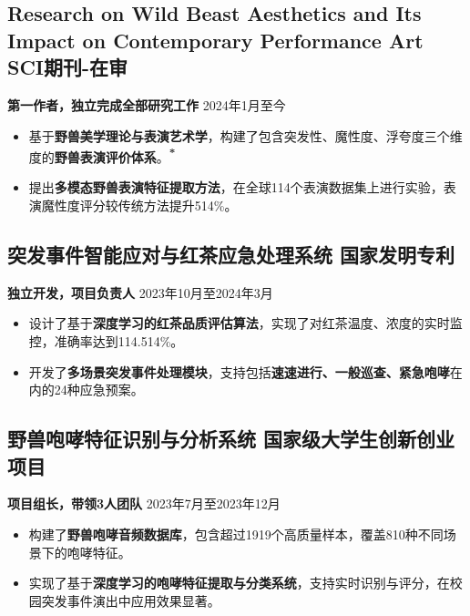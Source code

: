 \documentclass[4pt]{article}
\begin{document}
    \subsection{Research on Wild Beast Aesthetics and Its Impact on Contemporary Performance Art \hfill SCI期刊-在审}
    \textbf{第一作者，独立完成全部研究工作} \hfill 2024年1月至今

    \begin{itemize}
        \item 基于\textbf{野兽美学理论与表演艺术学}，构建了包含突发性、魔性度、浮夸度三个维度的\textbf{野兽表演评价体系}。{\textsuperscript{\textbf{\color{red}*}}}
        \item 提出\textbf{多模态野兽表演特征提取方法}，在全球114个表演数据集上进行实验，表演魔性度评分较传统方法提升514\%。
    \end{itemize}

    
    \vspace{0.5em}                %
    \subsection{突发事件智能应对与红茶应急处理系统 \hfill 国家发明专利}

    \textbf{独立开发，项目负责人} \hfill 2023年10月至2024年3月

    \begin{itemize}
        \item 设计了基于\textbf{深度学习的红茶品质评估算法}，实现了对红茶温度、浓度的实时监控，准确率达到114.514\%。
        \item 开发了\textbf{多场景突发事件处理模块}，支持包括\textbf{速速进行、一般巡查、紧急咆哮}在内的24种应急预案。
    \end{itemize}


    \vspace{0.5em}                %
    \subsection{野兽咆哮特征识别与分析系统 \hfill 国家级大学生创新创业项目}
        
    \textbf{项目组长，带领3人团队} \hfill 2023年7月至2023年12月

    \begin{itemize}
        \item 构建了\textbf{野兽咆哮音频数据库}，包含超过1919个高质量样本，覆盖810种不同场景下的咆哮特征。
        \item 实现了基于\textbf{深度学习的咆哮特征提取与分类系统}，支持实时识别与评分，在校园突发事件演出中应用效果显著。
    \end{itemize}
    
\end{document}
